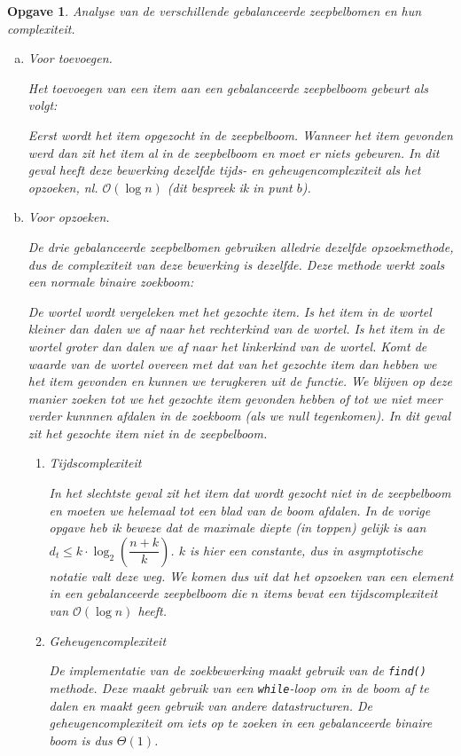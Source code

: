 \documentclass[12pt]{article}
\newtheorem{opgave}{Opgave}
\begin{document}
    \begin{opgave}
        Analyse van de verschillende gebalanceerde zeepbelbomen en hun complexiteit.
        \begin{enumerate}[a.]
            \item Voor toevoegen.

                \normalfont
                Het toevoegen van een item aan een gebalanceerde zeepbelboom gebeurt als volgt:

                Eerst wordt het item opgezocht in de zeepbelboom.
                Wanneer het item gevonden werd dan zit het item al in de zeepbelboom en moet er niets gebeuren.
                In dit geval heeft deze bewerking dezelfde tijds- en geheugencomplexiteit als het opzoeken, nl. $\mathcal{O}(\log n)$ (dit bespreek ik in punt $b$).
            \item Voor opzoeken.
                
                \normalfont
                De drie gebalanceerde zeepbelbomen gebruiken alledrie dezelfde opzoekmethode, dus de complexiteit van deze bewerking is dezelfde.
                Deze methode werkt zoals een normale binaire zoekboom: 
                
                De wortel wordt vergeleken met het gezochte item. Is het item in de wortel kleiner dan dalen we af naar het rechterkind van de wortel. 
                Is het item in de wortel groter dan dalen we af naar het linkerkind van de wortel.
                Komt de waarde van de wortel overeen met dat van het gezochte item dan hebben we het item gevonden en kunnen we terugkeren uit de functie.
                We blijven op deze manier zoeken tot we het gezochte item gevonden hebben of tot we niet meer verder kunnnen afdalen in de zoekboom (als we null tegenkomen).
                In dit geval zit het gezochte item niet in de zeepbelboom.

                \begin{enumerate}
                    \item Tijdscomplexiteit

                In het slechtste geval zit het item dat wordt gezocht niet in de zeepbelboom en moeten we helemaal tot een blad van de boom afdalen.
                In de vorige opgave heb ik beweze dat de maximale diepte (in toppen) gelijk is aan $d_t \le k \cdot \log_2{(\dfrac{n+k}{k})}$.
                $k$ is hier een constante, dus in asymptotische notatie valt deze weg.
                We komen dus uit dat het opzoeken van een element in een gebalanceerde zeepbelboom die $n$ items bevat een tijdscomplexiteit van $\mathcal{O}(\log n)$ heeft.
            \item Geheugencomplexiteit

                De implementatie van de zoekbewerking maakt gebruik van de {\tt find()} methode. Deze maakt gebruik van een {\tt while}-loop om in de boom af te dalen en maakt geen gebruik van andere datastructuren.
                De geheugencomplexiteit om iets op te zoeken in een gebalanceerde binaire boom is dus $\Theta(1)$.
        \end{enumerate}
        \end{enumerate}
    \end{opgave}
\end{document}
